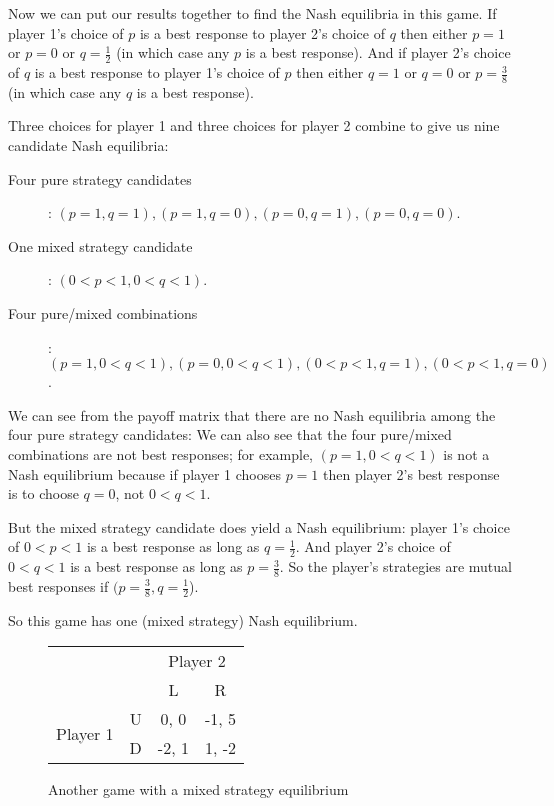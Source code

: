 \begin{CALCULUS}
\begin{enumerate}
{Now we can put our results together to find the Nash equilibria in this game. If player 1's choice of $p$ is a best response to player 2's choice of $q$ then either $p=1$ or $p=0$ or $q=\frac{1}{2}$ (in which case any $p$ is a best response). And if player 2's choice of $q$ is a best response to player 1's choice of $p$ then either $q=1$ or $q=0$ or $p=\frac{3}{8}$ (in which case any $q$ is a best response).

Three choices for player 1 and three choices for player 2 combine to give us nine candidate Nash equilibria:
\begin{description}
\item[Four pure strategy candidates]: $(p=1,q=1), (p=1, q=0), (p=0, q=1), (p=0, q=0)$.
\item[One mixed strategy candidate]: $(0<p<1, 0<q<1)$.
\item[Four pure/mixed combinations]: $(p=1, 0<q<1), (p=0, 0<q<1), (0<p<1,q=1), (0<p<1, q=0)$.
\end{description}
We can see from the payoff matrix that there are no Nash equilibria among the four pure strategy candidates: We can also see that the four pure/mixed combinations are not best responses; for example, $(p=1,0<q<1)$ is not a Nash equilibrium because if player 1 chooses $p=1$ then player 2's best response is to choose $q=0$, not $0<q<1$.

But the mixed strategy candidate does yield a Nash equilibrium: player 1's choice of $0<p<1$ is a best response as long as $q=\frac{1}{2}$. And player 2's choice of $0<q<1$ is a best response as long as $p=\frac{3}{8}$. So the player's strategies are mutual best responses if $(p=\frac{3}{8}, q=\frac{1}{2}$).

So this game has one (mixed strategy) Nash equilibrium.}

\begin{figure}[h]
\begin{center}
\begin{tabular}{crcc}
& & \multicolumn{2}{c}{Player 2} \\ [.15cm] & & L & R \\
\cline{3-4} \multirow{2}{1.5cm}{Player 1} & U &
\multicolumn{1}{|c|}{0, 0} & \multicolumn{1}{c|}{-1, 5} \\
\cline{3-4}
                   & D & \multicolumn{1}{|c|}{-2, 1} & \multicolumn{1}{c|}{1, -2} \\ \cline{3-4}
\end{tabular}
\end{center}
\caption{Another game with a mixed strategy equilibrium}
\label{fig:mixedex2}
\end{figure}



\end{enumerate}

\renewcommand\theenumi{\arabic{chapter}.\arabic{enumi}}
\end{CALCULUS}













